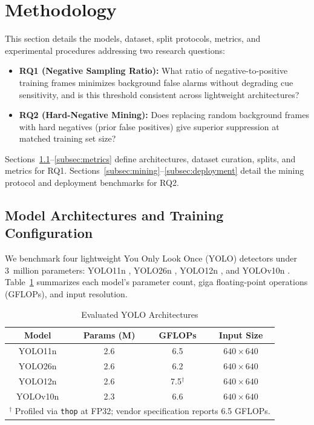 \documentclass[conference]{IEEEtran}
\begin{document}
\section{Methodology}
\label{sec:methodology}
This section details the models, dataset, split protocols, metrics, and experimental procedures addressing two research questions:
\begin{itemize}
    \item \textbf{RQ1 (Negative Sampling Ratio):} What ratio of negative-to-positive training frames minimizes background false alarms without degrading cue sensitivity, and is this threshold consistent across lightweight architectures?
    \item \textbf{RQ2 (Hard-Negative Mining):} Does replacing random background frames with hard negatives (prior false positives) give superior suppression at matched training set size?
\end{itemize}
Sections~\ref{subsec:arch}--\ref{subsec:metrics} define architectures, dataset curation, splits, and metrics for RQ1. Sections~\ref{subsec:mining}--\ref{subsec:deployment} detail the mining protocol and deployment benchmarks for RQ2.

\subsection{Model Architectures and Training Configuration}
\label{subsec:arch}
We benchmark four lightweight You Only Look Once (YOLO) detectors under 3~million parameters: YOLO11n \cite{khanam2024yolov11}, YOLO26n \cite{jocher2026yolo26}, YOLO12n \cite{tian2025yolov12}, and YOLOv10n \cite{wang2024yolov10}. Table~\ref{tab:models} summarizes each model's parameter count, giga floating-point operations (GFLOPs), and input resolution.

\begin{table}[htbp]
\caption{Evaluated YOLO Architectures}
\label{tab:models}
\begin{center}
\begin{tabular}{|c|c|c|c|}
\hline
\textbf{Model} & \textbf{Params (M)} & \textbf{GFLOPs} & \textbf{Input Size} \\
\hline
YOLO11n  & 2.6 & 6.5 & $640\times640$ \\
YOLO26n  & 2.6 & 6.2 & $640\times640$ \\
YOLO12n  & 2.6 & 7.5$^{\dagger}$ & $640\times640$ \\
YOLOv10n & 2.3 & 6.6 & $640\times640$ \\
\hline
\multicolumn{4}{l}{\footnotesize $^{\dagger}$ Profiled via \texttt{thop} at FP32; vendor specification reports 6.5 GFLOPs.}
\end{tabular}
\end{center}
\end{table}
\end{document}
